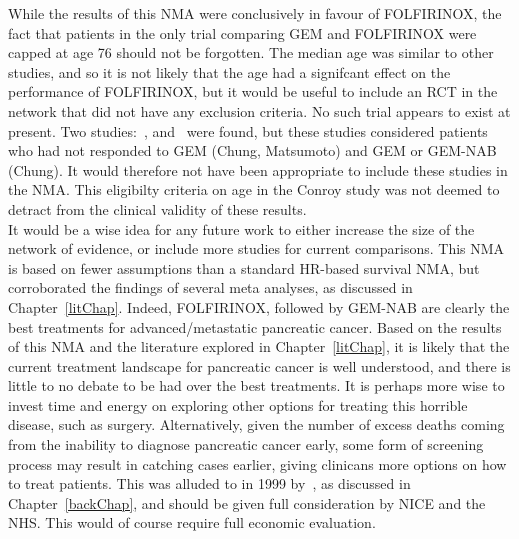 While the results of this NMA were conclusively in favour of FOLFIRINOX, the fact that patients in the only trial comparing GEM and FOLFIRINOX were capped at age 76 should not be forgotten. The median age was similar to other studies, and so it is not likely that the age had a signifcant effect on the performance of FOLFIRINOX, but it would be useful to include an RCT in the network that did not have any exclusion criteria. No such trial appears to exist at present. Two studies:~\cite{matsumoto}, and~\cite{chung} were found, but these studies considered patients who had not responded to GEM (Chung, Matsumoto) and GEM or GEM-NAB (Chung). It would therefore not have been appropriate to include these studies in the NMA. This eligibilty criteria on age in the Conroy study was not deemed to detract from the clinical validity of these results. \\

It would be a wise idea for any future work to either increase the size of the network of evidence, or include more studies for current comparisons. This NMA is based on fewer assumptions than a standard HR-based survival NMA, but corroborated the findings of several meta analyses, as discussed in Chapter~\ref{litChap}. Indeed, FOLFIRINOX, followed by GEM-NAB are clearly the best treatments for advanced/metastatic pancreatic cancer. Based on the results of this NMA and the literature explored in Chapter~\ref{litChap}, it is likely that the current treatment landscape for pancreatic cancer is well understood, and there is little to no debate to be had over the best treatments. It is perhaps more wise to invest time and energy on exploring other options for treating this horrible disease, such as surgery. Alternatively, given the number of excess deaths coming from the inability to diagnose pancreatic cancer early, some form of screening process may result in catching cases earlier, giving clinicans more options on how to treat patients. This was alluded to in 1999 by~\cite{dimagno}, as discussed in Chapter~\ref{backChap}, and should be given full consideration by NICE and the NHS. This would of course require full economic evaluation. \\

